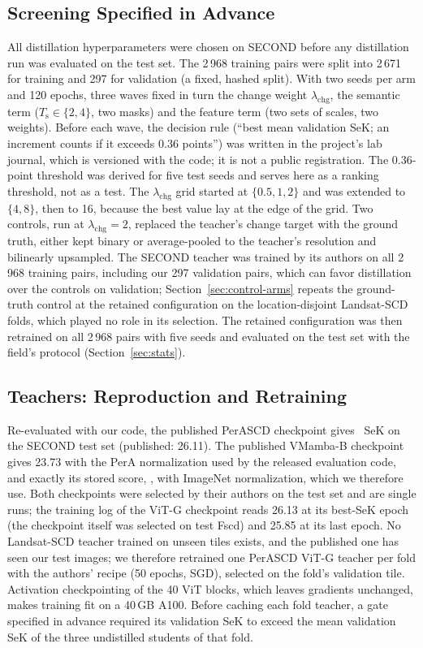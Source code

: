\documentclass[journal]{IEEEtran}
\begin{document}
\subsection{Screening Specified in Advance}
\label{sec:screening}
All distillation hyperparameters were chosen on SECOND before any distillation run was evaluated
on the test set. The 2\,968 training pairs were split into 2\,671 for training and 297 for
validation (a fixed, hashed split). With two seeds per arm and 120 epochs, three waves fixed in
turn the change weight $\lambda_{\mathrm{chg}}$, the semantic term ($T_{\mathrm{s}}\in\{2,4\}$, two
masks) and the feature term (two sets of scales, two weights). Before each wave, the decision rule
(``best mean validation SeK; an increment counts if it exceeds 0.36 points'') was written in the
project's lab journal, which is versioned with the code; it is not a public registration. The
0.36-point threshold was derived for five test seeds and serves here as a ranking threshold, not
as a test. The $\lambda_{\mathrm{chg}}$ grid started at $\{0.5,1,2\}$ and was extended to $\{4,8\}$,
then to 16, because the best value lay at the edge of the grid. Two controls, run at
$\lambda_{\mathrm{chg}}=2$, replaced the teacher's change target with the ground truth, either kept binary
or average-pooled to the teacher's resolution and bilinearly upsampled. The SECOND teacher was trained
by its authors on all 2\,968 training pairs, including our 297 validation pairs, which can favor
distillation over the controls on validation; Section~\ref{sec:control-arms} repeats the
ground-truth control at the retained configuration on the location-disjoint Landsat-SCD folds,
which played no role in its selection. The retained configuration was then retrained on all
2\,968 pairs with five seeds and evaluated on the test set with the field's protocol
(Section~\ref{sec:stats}).

\subsection{Teachers: Reproduction and Retraining}
\label{sec:teachers}
Re-evaluated with our code, the published PerASCD checkpoint gives \TeacherVitgSekExact\ SeK
on the SECOND test set (published: 26.11). The published VMamba-B checkpoint gives 23.73 with
the PerA normalization used by the released evaluation code, and exactly its stored score,
\TeacherVmbSekExact, with ImageNet normalization, which we therefore use. Both checkpoints were
selected by their authors on the test set and are single runs; the training log of the ViT-G
checkpoint reads 26.13 at its best-SeK epoch (the checkpoint itself was selected on test Fscd) and
25.85 at its last epoch. No Landsat-SCD teacher trained
on unseen tiles exists, and the published one has seen our test images; we therefore retrained
one PerASCD ViT-G teacher per fold with the authors' recipe (50 epochs, SGD), selected on the
fold's validation tile. Activation checkpointing of the 40 ViT blocks, which leaves gradients
unchanged, makes training fit on a 40\,GB A100. Before caching each fold teacher, a gate specified in advance required its validation SeK to exceed the mean validation SeK of the three undistilled
students of that fold.
\end{document}
